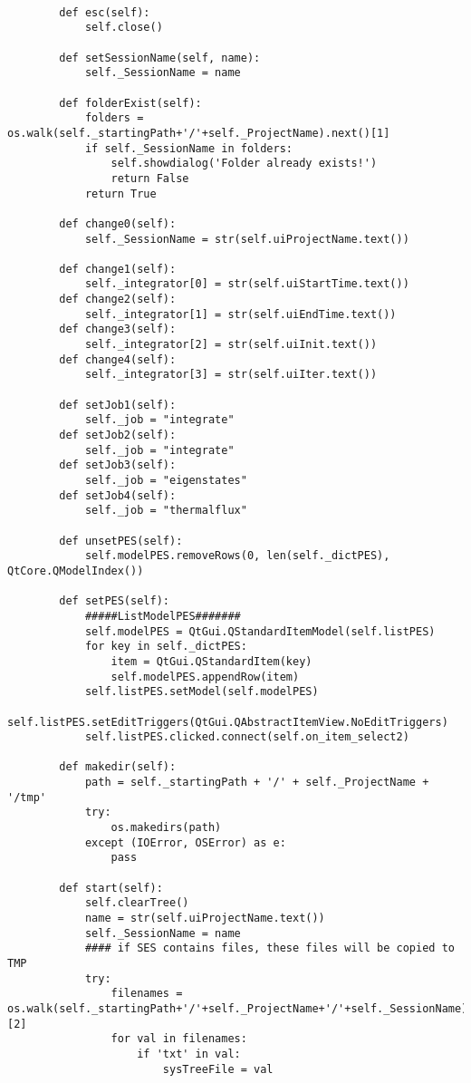 \begin{verbatim}
    
        def esc(self):
            self.close()
    
        def setSessionName(self, name):
            self._SessionName = name
    
        def folderExist(self):
            folders = os.walk(self._startingPath+'/'+self._ProjectName).next()[1]
            if self._SessionName in folders:
                self.showdialog('Folder already exists!')
                return False
            return True
            
        def change0(self):
            self._SessionName = str(self.uiProjectName.text())
    
        def change1(self):
            self._integrator[0] = str(self.uiStartTime.text())
        def change2(self):
            self._integrator[1] = str(self.uiEndTime.text())
        def change3(self):
            self._integrator[2] = str(self.uiInit.text())
        def change4(self):
            self._integrator[3] = str(self.uiIter.text())
    
        def setJob1(self):
            self._job = "integrate"
        def setJob2(self):
            self._job = "integrate"
        def setJob3(self):
            self._job = "eigenstates"
        def setJob4(self):
            self._job = "thermalflux"
    
        def unsetPES(self):
            self.modelPES.removeRows(0, len(self._dictPES), QtCore.QModelIndex())
    
        def setPES(self):
            #####ListModelPES#######
            self.modelPES = QtGui.QStandardItemModel(self.listPES)
            for key in self._dictPES:
                item = QtGui.QStandardItem(key)
                self.modelPES.appendRow(item)
            self.listPES.setModel(self.modelPES)
            self.listPES.setEditTriggers(QtGui.QAbstractItemView.NoEditTriggers)
            self.listPES.clicked.connect(self.on_item_select2)
    
        def makedir(self):
            path = self._startingPath + '/' + self._ProjectName + '/tmp'
            try:
                os.makedirs(path)
            except (IOError, OSError) as e:
                pass
    
        def start(self):
            self.clearTree()
            name = str(self.uiProjectName.text())
            self._SessionName = name
            #### if SES contains files, these files will be copied to TMP
            try:
                filenames = os.walk(self._startingPath+'/'+self._ProjectName+'/'+self._SessionName).next()[2]
                for val in filenames:
                    if 'txt' in val:
                        sysTreeFile = val
    

\end{verbatim}
